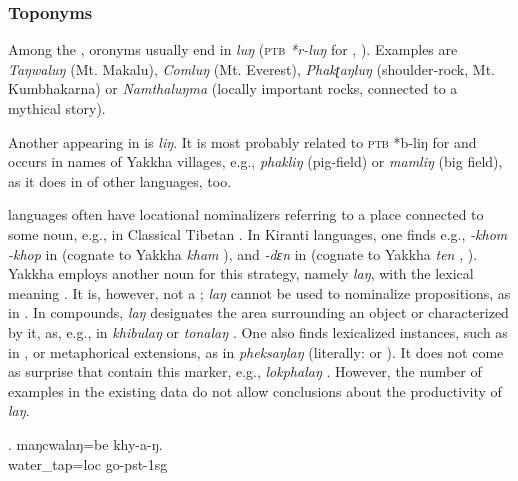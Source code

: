  
\subsubsection{Toponyms}
 
Among the , oronyms usually end in \emph{luŋ} (\textsc{ptb} \emph{*r-luŋ} for , \citealt[50]{Matisoff2003Handbook}). Examples are \emph{Taŋwaluŋ} (Mt. Makalu), \emph{Comluŋ} (Mt. Everest), \emph{Phakʈaŋluŋ}  (shoulder-rock, Mt. Kumbhakarna) or \emph{Namthaluŋma} (locally important rocks, connected to a mythical story).

Another  appearing in  is \emph{liŋ}. It  is most probably related to \textsc{ptb} *b-liŋ for   \citep[280]{Matisoff2003Handbook} and occurs in names of Yakkha villages, e.g., \emph{phakliŋ} (pig-field) or \emph{mamliŋ}  (big field), as it does in  of other  languages, too.

 languages often have locational nominalizers referring to a place connected to some noun, e.g., in Classical Tibetan \citep[300]{Beyer1992_Tibetan}. In Kiranti languages, one finds e.g., \emph{-khom \ti -khop} in  (cognate to Yakkha \emph{kham} ), and \emph{-dɛn} in  (cognate to Yakkha \emph{ten} , \citealt[89]{Ebert1994The-structure}). Yakkha  employs another noun for this strategy, namely \emph{laŋ}, with the lexical meaning . It is, however, not a ;  \emph{laŋ} cannot be used to nominalize propositions, as in . In compounds, \emph{laŋ} designates the area surrounding an object or characterized by it, as, e.g., in \emph{khibulaŋ}  or \emph{tonalaŋ} . One also finds lexicalized instances, such as in \Next, or metaphorical extensions, as in \emph{pheksaŋlaŋ}  (literally:  or ). It does not come as surprise that  contain this marker, e.g., \emph{lokphalaŋ} . However, the number of examples in the existing data do not allow conclusions about the productivity of \emph{laŋ}. 

\exg. maŋcwalaŋ=be khy-a-ŋ.\\
water\_tap{\sc =loc} go{\sc -pst-1sg}\\
  


